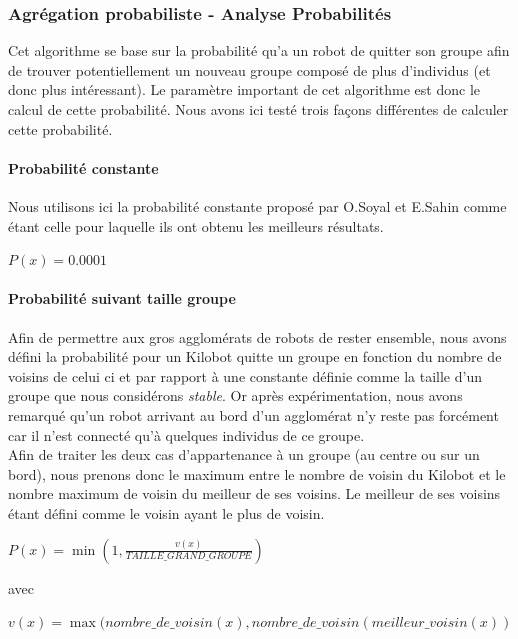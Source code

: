 \documentclass[a4paper]{article}
\begin{document}
\subsubsection{Agrégation probabiliste - Analyse Probabilités}
Cet algorithme se base sur la probabilité qu'a un robot de quitter son groupe afin de trouver potentiellement un nouveau groupe composé de plus d'individus (et donc plus intéressant). Le paramètre important de cet algorithme est donc le calcul de cette probabilité. Nous avons ici testé trois façons différentes de calculer cette probabilité.
\paragraph{Probabilité constante} Nous utilisons ici la probabilité constante proposé par O.Soyal et E.Sahin comme étant celle pour laquelle ils ont obtenu les meilleurs résultats.
\begin{center}
	$P(x)=0.0001$
\end{center}
\paragraph{Probabilité suivant taille groupe} Afin de permettre aux gros agglomérats de robots de rester ensemble, nous avons défini la probabilité pour un Kilobot quitte un groupe en fonction du nombre de voisins de celui ci et par rapport à une constante définie comme la taille d'un groupe que nous considérons \textit{stable}. Or après expérimentation, nous avons remarqué qu'un robot arrivant au bord d'un agglomérat n'y reste pas forcément car il n'est connecté qu'à quelques individus de ce groupe.\\Afin de traiter les deux cas d'appartenance à un groupe (au centre ou sur un bord), nous prenons donc le maximum entre le nombre de voisin du Kilobot et le nombre maximum de voisin du meilleur de ses voisins. Le meilleur de ses voisins étant défini comme le voisin ayant le plus de voisin.
\begin{center}
	$P(x)=\min(1,\frac{v(x)}{TAILLE\_GRAND\_GROUPE})$
\end{center}
avec
\begin{center}
	$v(x)=\max(nombre\_de\_voisin(x),nombre\_de\_voisin(meilleur\_voisin(x))$
\end{center}
\end{document}
